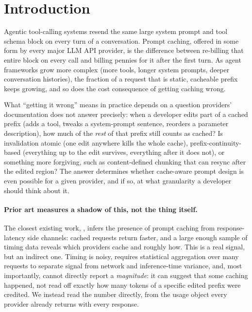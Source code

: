 \documentclass[11pt]{article}
\begin{document}
\section{Introduction}

Agentic tool-calling systems resend the same large system prompt and tool
schema block on every turn of a conversation. Prompt caching, offered in some
form by every major LLM API provider, is the difference between re-billing
that entire block on every call and billing pennies for it after the first
turn. As agent frameworks grow more complex (more tools, longer system
prompts, deeper conversation histories), the fraction of a request that is
static, cacheable prefix keeps growing, and so does the cost consequence of
getting caching wrong.

What ``getting it wrong'' means in practice depends on a question providers'
documentation does not answer precisely: when a developer edits part of a
cached prefix (adds a tool, tweaks a system-prompt sentence, reorders a
parameter description), how much of the \emph{rest} of that prefix still
counts as cached? Is invalidation atomic (one edit anywhere kills the whole
cache), prefix-continuity-based (everything up to the edit survives,
everything after it does not), or something more forgiving, such as
content-defined chunking that can resync after the edited region? The answer
determines whether cache-aware prompt design is even possible for a given
provider, and if so, at what granularity a developer should think about it.

\paragraph{Prior art measures a shadow of this, not the thing itself.} The
closest existing work, \citet{prompt-cache-audit}, infers the presence of
prompt caching from response-latency side channels: cached requests return
faster, and a large enough sample of timing data reveals which providers
cache and roughly how. This is a real signal, but an indirect one. Timing is
noisy, requires statistical aggregation over many requests to separate
signal from network and inference-time variance, and, most importantly,
cannot directly report a \emph{magnitude}: it can suggest that some caching
happened, not read off exactly how many tokens of a specific edited prefix
were credited. We instead read the number directly, from the usage object
every provider already returns with every response.
\end{document}

